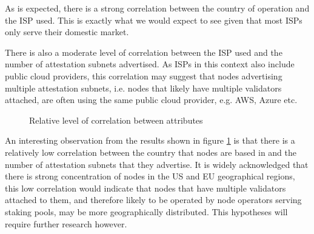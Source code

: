 \documentclass[conference]{IEEEtran}
\begin{document}
As is expected, there is a strong correlation between the country of operation and the ISP used.  This is exactly what we would expect to see given that most ISPs only serve their domestic market.

There is also a moderate level of correlation between the ISP used and the number of attestation subnets advertised.  As ISPs in this context also include public cloud providers, this correlation may suggest that nodes advertising multiple attestation subnets, i.e. nodes that likely have multiple validators attached, are often using the same public cloud provider, e.g. AWS, Azure etc.

\begin{figure}[htbp]
    \centering
    \caption{Relative level of correlation between attributes}
    \label{fig:relative-level-of-correlation-between-attributes}
\end{figure}

An interesting observation from the results shown in figure \ref{fig:relative-level-of-correlation-between-attributes} is that there is a relatively low correlation between the country that nodes are based in and the number of attestation subnets that they advertise.  It is widely acknowledged that there is  strong concentration of nodes in the US and EU geographical regions, this low correlation would indicate that nodes that have multiple validators attached to them, and therefore likely to be operated by node operators serving staking pools, may be more geographically distributed.  This hypotheses will require further research however.
\end{document}
